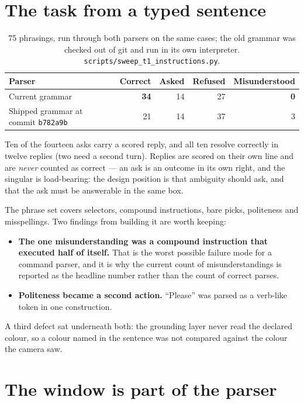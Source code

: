 \documentclass[11pt,a4paper,oneside]{report}
\newcommand{\code}[1]{\texttt{\small #1}}
\newcommand{\file}[1]{\texttt{\small #1}}
\begin{document}
\section{The task from a typed sentence}

\begin{table}[H]
\centering
\small
\begin{tabular}{@{}lrrrr@{}}
\toprule
\textbf{Parser} & \textbf{Correct} & \textbf{Asked} & \textbf{Refused} & \textbf{Misunderstood} \\
\midrule
Current grammar & \textbf{34} & 14 & 27 & \textbf{0} \\
Shipped grammar at commit \code{b782a9b} & 21 & 14 & 37 & 3 \\
\bottomrule
\end{tabular}
\caption{75 phrasings, run through both parsers on the same cases; the old
grammar was checked out of git and run in its own interpreter.
\file{scripts/sweep\_t1\_instructions.py}.}
\end{table}

Ten of the fourteen asks carry a scored reply, and all ten resolve correctly in
twelve replies (two need a second turn). Replies are scored on their own line
and are \emph{never} counted as correct --- an ask is an outcome in its own
right, and the singular is load-bearing: the design position is that ambiguity
should ask, and that the ask must be answerable in the same box.

The phrase set covers selectors, compound instructions, bare picks, politeness
and misspellings. Two findings from building it are worth keeping:

\begin{itemize}
\item \textbf{The one misunderstanding was a compound instruction that executed
      half of itself.} That is the worst possible failure mode for a command
      parser, and it is why the current count of misunderstandings is reported
      as the headline number rather than the count of correct parses.
\item \textbf{Politeness became a second action.} ``Please'' was parsed as a
      verb-like token in one construction.
\end{itemize}

A third defect sat underneath both: the grounding layer never read the declared
colour, so a colour named in the sentence was not compared against the colour
the camera saw.

\section{The window is part of the parser}
\end{document}
